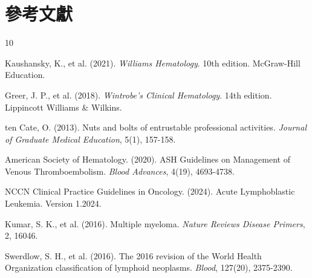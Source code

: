 \documentclass[12pt,a4paper]{article}
\begin{document}
\section{參考文獻}
\begin{thebibliography}{10}

Kaushansky, K., et al. (2021). \textit{Williams Hematology}. 10th edition. McGraw-Hill Education.

Greer, J. P., et al. (2018). \textit{Wintrobe's Clinical Hematology}. 14th edition. Lippincott Williams \& Wilkins.

ten Cate, O. (2013). Nuts and bolts of entrustable professional activities. \textit{Journal of Graduate Medical Education}, 5(1), 157-158.

American Society of Hematology. (2020). ASH Guidelines on Management of Venous Thromboembolism. \textit{Blood Advances}, 4(19), 4693-4738.

NCCN Clinical Practice Guidelines in Oncology. (2024). Acute Lymphoblastic Leukemia. Version 1.2024.

Kumar, S. K., et al. (2016). Multiple myeloma. \textit{Nature Reviews Disease Primers}, 2, 16046.

Swerdlow, S. H., et al. (2016). The 2016 revision of the World Health Organization classification of lymphoid neoplasms. \textit{Blood}, 127(20), 2375-2390.

\end{thebibliography}
\end{document}

